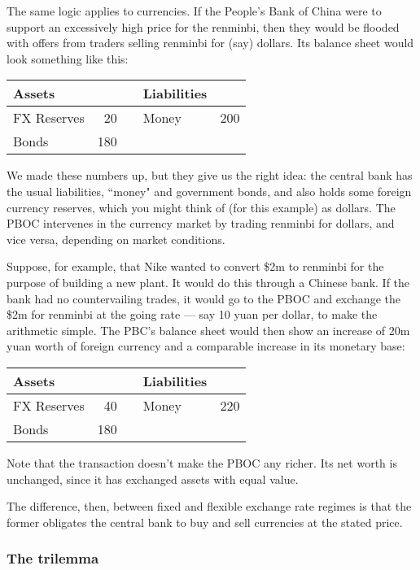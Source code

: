 \documentclass[letterpaper,12pt]{article}
\begin{document}
The same logic applies to currencies.
If the People's Bank of China were to support an excessively high price for
the renminbi, then they would be flooded with offers from traders
selling renminbi for (say) dollars.
Its balance sheet would look something like this:
%
\begin{center}
\begin{tabular}{lrclr}
               Assets  &     &&     Liabilities                     \\
               \hline
               FX Reserves &  20 &&     Money &  200   \\
               Bonds   & 180 && \\
\end{tabular}
\end{center}
%
We made these numbers up, but they give us the right idea:
the central bank has the usual liabilities,
``money" and government bonds,
and also holds some foreign currency reserves,
which you might think of (for this example) as dollars.
The PBOC intervenes in the currency market by trading renminbi for dollars,
and vice versa, depending on market conditions.


Suppose, for example, that Nike wanted to convert
\$2m to renminbi for the purpose of building a new plant.
It would do this through a Chinese bank.
If the bank had no countervailing trades, it would
go to the PBOC and exchange the \$2m for renminbi at the going rate
--- say 10 yuan per dollar, to make the arithmetic simple.
The PBC's balance sheet would then show an increase of
20m yuan worth of foreign currency
and a comparable increase in its monetary base:
%
\begin{center}
\begin{tabular}{lrclr}
               Assets  &     &&     Liabilities                     \\
               \hline
               FX Reserves &  40 &&     Money &  220   \\
               Bonds  & 180 &&
\end{tabular}
\end{center}
%
Note that the transaction doesn't make the PBOC any richer.
Its net worth is unchanged,
since it has exchanged assets with equal value.

The difference, then, between fixed and flexible exchange rate regimes
is that the former obligates the central bank to buy and sell
currencies at the stated price.

\subsubsection*{The trilemma}
\end{document}

